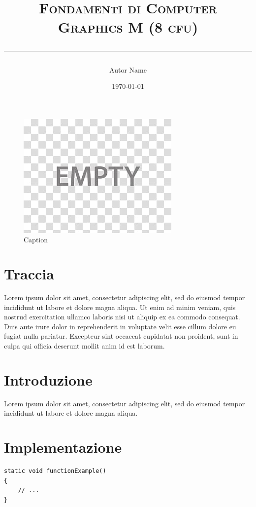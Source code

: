 \documentclass[11pt]{article}
\title{\textsc{Fondamenti di Computer Graphics M (8 cfu)} \\[\subtitlelinesep]

\smaller[\subtitlerelsize]{\textcolor{gray}{\textsc{Lab N - Title}}} 
\vspace{10pt}\hrule\vspace{10pt}}
\author{Autor Name}
\date{\today}
\begin{document}
\maketitle

\begin{figure}[H]
    \centering
    \includegraphics[width=1.\columnwidth]{gfx/Thumbnail.jpg}
    \caption{Caption}
    \label{fig:thumbnail.png}
\end{figure}

\section*{Traccia}
Lorem ipsum dolor sit amet, consectetur adipiscing elit, sed do eiusmod tempor incididunt ut labore et dolore magna aliqua. Ut enim ad minim veniam, quis nostrud exercitation ullamco laboris nisi ut aliquip ex ea commodo consequat. Duis aute irure dolor in reprehenderit in voluptate velit esse cillum dolore eu fugiat nulla pariatur. Excepteur sint occaecat cupidatat non proident, sunt in culpa qui officia deserunt mollit anim id est laborum.

\section{Introduzione}
Lorem ipsum dolor sit amet, consectetur adipiscing elit, sed do eiusmod tempor incididunt ut labore et dolore magna aliqua. 

\section{Implementazione}
\begin{verbatim}
static void functionExample()
{
    // ...
}
\end{verbatim}
\end{document}
